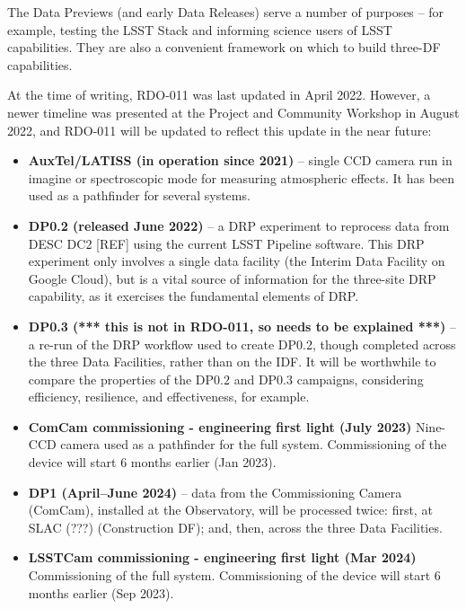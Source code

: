 The Data Previews (and early Data Releases) serve a number of purposes
-- for example, testing the LSST Stack and informing science users of
LSST capabilities. They are also a convenient framework on which
to build three-DF capabilities.

At the time of writing, RDO-011 was last updated in April
2022. However, a newer timeline was presented at the Project and
Community Workshop in August 2022, and RDO-011 will be updated to
reflect this update in the near future:

\begin{itemize}

\item {\bf AuxTel/LATISS (in operation since 2021)} -- single CCD
  camera run in imagine or spectroscopic mode for measuring
  atmospheric effects. It has been used as a pathfinder for several
  systems.
  
\item {\bf DP0.2 (released June 2022)} -- a DRP experiment to
  reprocess data from DESC DC2 [REF] using the current LSST Pipeline
  software. This DRP experiment only involves a single data facility
  (the Interim Data Facility on Google Cloud), but is a vital source
  of information for the three-site DRP capability, as it exercises
  the fundamental elements of DRP.
  
\item {\bf DP0.3 (*** this is not in RDO-011, so needs to be explained
  ***)} -- a re-run of the DRP workflow used to create DP0.2, though
  completed across the three Data Facilities, rather than on the IDF. It
  will be worthwhile to compare the properties of the DP0.2 and DP0.3
  campaigns, considering efficiency, resilience, and effectiveness,
  for example.

\item{\bf ComCam commissioning - engineering first light (July 2023)}
  Nine-CCD camera used as a pathfinder for the full
  system. Commissioning of the device will start 6 months earlier (Jan
  2023).
  
\item {\bf DP1 (April--June 2024)} -- data from the Commissioning
  Camera (ComCam), installed at the Observatory, will be processed
  twice: first, at SLAC (???) (Construction DF); and, then, across the
  three Data Facilities.

 \item{\bf LSSTCam commissioning - engineering first light (Mar 2024)}
   Commissioning of the full system. Commissioning of the device will
   start 6 months earlier (Sep 2023).
  

\end{itemize}
